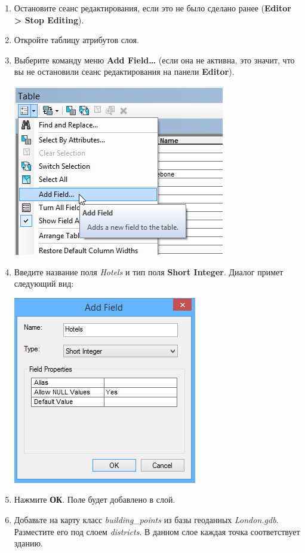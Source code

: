 \documentclass[]{book}
\theoremstyle{definition}
\theoremstyle{definition}
\theoremstyle{definition}
\theoremstyle{remark}
\begin{document}
\begin{enumerate}
\def\labelenumi{\arabic{enumi}.}
\item
  Остановите сеанс редактирования, если это не было сделано ранее
  (\textbf{Editor \textgreater{} Stop Editing}).
\item
  Откройте таблицу атрибутов слоя.
\item
  Выберите команду меню \textbf{Add Field\ldots{}} (если она не активна,
  это значит, что вы не остановили сеанс редактирования на панели
  \textbf{Editor}).

  \includegraphics{images/Ex06/image14.png}
\item
  Введите название поля \emph{Hotels} и тип поля \textbf{Short Integer}.
  Диалог примет следующий вид:

  \includegraphics{images/Ex06/image15.png}
\item
  Нажмите \textbf{ОК}. Поле будет добавлено в слой.
\item
  Добавьте на карту класс \emph{building\_points} из базы геоданных
  \emph{London.gdb}. Разместите его под слоем \emph{districts}. В данном
  слое каждая точка соответствует зданию.


\end{enumerate}
\end{document}
